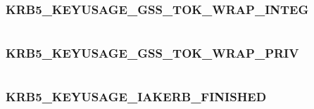 \documentclass[letterpaper,10pt,english]{sphinxmanual}
\begin{document}
\subsubsection{KRB5\_KEYUSAGE\_GSS\_TOK\_WRAP\_INTEG}
\label{appdev/refs/macros/KRB5_KEYUSAGE_GSS_TOK_WRAP_INTEG::doc}\label{appdev/refs/macros/KRB5_KEYUSAGE_GSS_TOK_WRAP_INTEG:krb5-keyusage-gss-tok-wrap-integ}\label{appdev/refs/macros/KRB5_KEYUSAGE_GSS_TOK_WRAP_INTEG:krb5-keyusage-gss-tok-wrap-integ-data}

\begin{fulllineitems}
\label{appdev/refs/macros/KRB5_KEYUSAGE_GSS_TOK_WRAP_INTEG:KRB5_KEYUSAGE_GSS_TOK_WRAP_INTEG}
\end{fulllineitems}


\begin{tabulary}{\linewidth}{|L|L|}
\hline

 & 
\\
\hline\end{tabulary}



\subsubsection{KRB5\_KEYUSAGE\_GSS\_TOK\_WRAP\_PRIV}
\label{appdev/refs/macros/KRB5_KEYUSAGE_GSS_TOK_WRAP_PRIV:krb5-keyusage-gss-tok-wrap-priv-data}\label{appdev/refs/macros/KRB5_KEYUSAGE_GSS_TOK_WRAP_PRIV::doc}\label{appdev/refs/macros/KRB5_KEYUSAGE_GSS_TOK_WRAP_PRIV:krb5-keyusage-gss-tok-wrap-priv}

\begin{fulllineitems}
\label{appdev/refs/macros/KRB5_KEYUSAGE_GSS_TOK_WRAP_PRIV:KRB5_KEYUSAGE_GSS_TOK_WRAP_PRIV}
\end{fulllineitems}


\begin{tabulary}{\linewidth}{|L|L|}
\hline

 & 
\\
\hline\end{tabulary}



\subsubsection{KRB5\_KEYUSAGE\_IAKERB\_FINISHED}
\label{appdev/refs/macros/KRB5_KEYUSAGE_IAKERB_FINISHED:krb5-keyusage-iakerb-finished-data}\label{appdev/refs/macros/KRB5_KEYUSAGE_IAKERB_FINISHED::doc}\label{appdev/refs/macros/KRB5_KEYUSAGE_IAKERB_FINISHED:krb5-keyusage-iakerb-finished}
\end{document}
